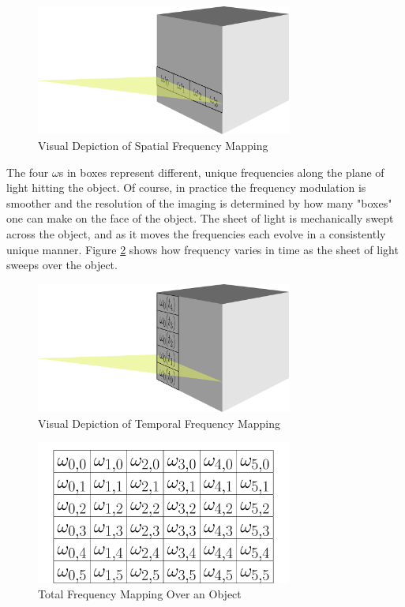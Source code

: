 \documentclass[12pt]{article}
\begin{document}
\begin{figure}[ht]
	\centering
	\includegraphics[width=0.75\textwidth]{spifi-line-on-cube.png}
	\caption{Visual Depiction of Spatial Frequency Mapping}
	\label{fig:cube-line}
\end{figure}

The four $\omega$s in boxes represent different, unique frequencies along the plane of light hitting the object. Of course, in practice the frequency modulation is smoother and the resolution of the imaging is determined by how many "boxes" one can make on the face of the object. The sheet of light is mechanically swept across the object, and as it moves the frequencies each evolve in a consistently unique manner. Figure \ref{fig:cube-sheet} shows how frequency varies in time as the sheet of light sweeps over the object.

\begin{figure}[ht]
	\centering
	\includegraphics[width=0.75\textwidth]{spifi-sheet-on-cube}
	\caption{Visual Depiction of Temporal Frequency Mapping}
	\label{fig:cube-sheet}
\end{figure}



\begin{figure}[ht]
\centering
\includegraphics[width=0.75\textwidth]{spifi-grid.png}
\caption{Total Frequency Mapping Over an Object\label{fig:mapping-diagram}}
\end{figure}
\end{document}
